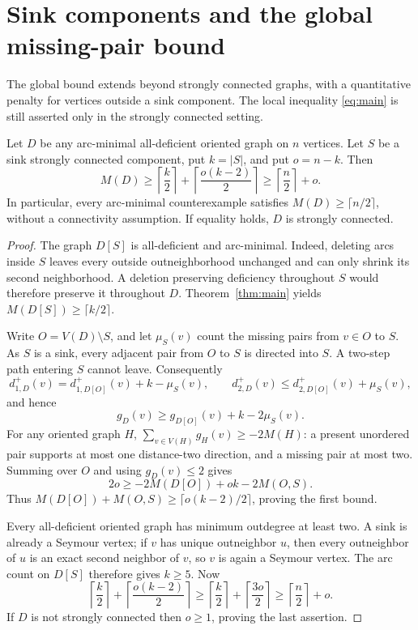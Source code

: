 \section{Sink components and the global missing-pair bound}\label{sec:sink}

The global bound extends beyond strongly connected graphs, with a
quantitative penalty for vertices outside a sink component. The local
inequality \eqref{eq:main} is still asserted only in the strongly
connected setting.

\begin{theorem}\label{thm:sink}
Let $D$ be any arc-minimal all-deficient oriented graph on $n$ vertices.
Let $S$ be a sink strongly connected component, put $k=|S|$, and put
$o=n-k$. Then
\begin{equation}\label{eq:sink}
M(D)\ge
\left\lceil\frac{k}{2}\right\rceil+
\left\lceil\frac{o(k-2)}2\right\rceil
\ge\left\lceil\frac n2\right\rceil+o.
\end{equation}
In particular, every arc-minimal counterexample satisfies
$M(D)\ge\lceil n/2\rceil$, without a connectivity assumption.
If equality holds, $D$ is strongly connected.
\end{theorem}
\begin{proof}
The graph $D[S]$ is all-deficient and arc-minimal. Indeed, deleting arcs
inside $S$ leaves every outside outneighborhood unchanged and can only
shrink its second neighborhood. A deletion preserving deficiency
throughout $S$ would therefore preserve it throughout $D$.
Theorem~\ref{thm:main} yields $M(D[S])\ge\lceil k/2\rceil$.

Write $O=V(D)\setminus S$, and let $\mu_S(v)$ count the missing pairs
from $v\in O$ to $S$. As $S$ is a sink, every adjacent pair from $O$ to
$S$ is directed into $S$. A two-step path entering $S$ cannot leave.
Consequently
\[
d_{1,D}^+(v)=d_{1,D[O]}^+(v)+k-\mu_S(v),\qquad
d_{2,D}^+(v)\le d_{2,D[O]}^+(v)+\mu_S(v),
\]
and hence
\[
g_D(v)\ge g_{D[O]}(v)+k-2\mu_S(v).
\]
For any oriented graph $H$,
$\sum_{v\in V(H)}g_H(v)\ge-2M(H)$: a present unordered pair supports at
most one distance-two direction, and a missing pair at most two.
Summing over $O$ and using $g_D(v)\le2$ gives
\[
2o\ge -2M(D[O])+ok-2M(O,S).
\]
Thus $M(D[O])+M(O,S)\ge\lceil o(k-2)/2\rceil$, proving the first bound.

Every all-deficient oriented graph has minimum outdegree at least two.
A sink is already a Seymour vertex; if $v$ has unique outneighbor $u$,
then every outneighbor of $u$ is an exact second neighbor of $v$, so
$v$ is again a Seymour vertex. The arc count on $D[S]$ therefore gives
$k\ge5$. Now
\[
\left\lceil\frac{k}{2}\right\rceil+
\left\lceil\frac{o(k-2)}2\right\rceil
\ge
\left\lceil\frac{k}{2}\right\rceil+
\left\lceil\frac{3o}{2}\right\rceil
\ge\left\lceil\frac n2\right\rceil+o.
\]
If $D$ is not strongly connected then $o\ge1$, proving the last assertion.
\end{proof}


